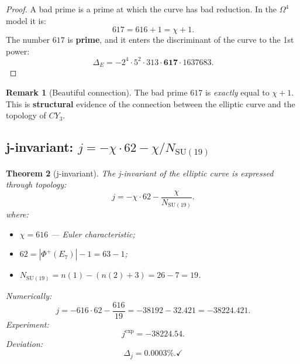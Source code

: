 \documentclass[11pt,a4paper]{article}
\newcommand{\SU}{\mathrm{SU}}
\newcommand{\CY}{CY_3}
\newcommand{\Om}{\Omega^4}
\newtheorem{theorem}{Theorem}[section]
\theoremstyle{definition}
\newtheorem{remark}[theorem]{Remark}
\begin{document}
\begin{proof}
A bad prime is a prime at which the curve has 
bad reduction. In the $\Om$ model it is:
\begin{equation}
    617 = 616 + 1 = \chi + 1.
\end{equation}
The number $617$ is \textbf{prime}, and it enters the discriminant 
of the curve to the 1st power:
\begin{equation}
    \Delta_E = -2^4 \cdot 5^2 \cdot 313 \cdot \mathbf{617} 
    \cdot 1637683.
\end{equation}
\end{proof}

\begin{remark}[Beautiful connection]
\label{rem:bad-prime-beauty}
The bad prime $617$ is \emph{exactly} equal to $\chi + 1$. This is 
\textbf{structural} evidence of the connection between the elliptic 
curve and the topology of $\CY$.
\end{remark}

\subsection{j-invariant: $j = -\chi \cdot 62 - \chi/N_{\SU(19)}$}
\label{subsec:j-invariant}

\begin{theorem}[j-invariant]
\label{thm:j-invariant}
The j-invariant of the elliptic curve is expressed through 
topology:
\begin{equation}
    \boxed{
    j = -\chi \cdot 62 - \frac{\chi}{N_{\SU(19)}}.
    }
    \label{eq:j-invariant}
\end{equation}
where:
\begin{itemize}
    \item $\chi = 616$ — Euler characteristic;
    \item $62 = |\Phi^+(E_7)| - 1 = 63 - 1$;
    \item $N_{\SU(19)} = n(1) - (n(2) + 3) = 26 - 7 = 19$.
\end{itemize}
Numerically:
\begin{equation}
    j = -616 \cdot 62 - \frac{616}{19} 
      = -38192 - 32.421 
      = -38224.421.
\end{equation}
Experiment:
\begin{equation}
    j^{\text{exp}} = -38224.54.
\end{equation}
Deviation:
\begin{equation}
    \Delta_j = \mathbf{0.0003\%}. \checkmark
\end{equation}
\end{theorem}
\end{document}
